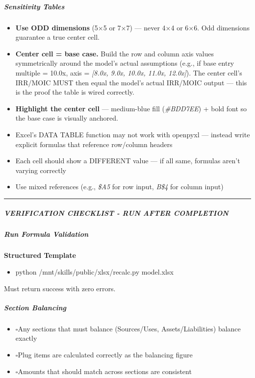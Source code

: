 \documentclass[11pt]{article}
\newcommand{\UncheckedBox}{$\square$}
\begin{document}
\subparagraph{Sensitivity Tables}\mbox{}\par
\begin{itemize}[leftmargin=*,itemsep=2pt,topsep=2pt]
\item {} \textbf{Use ODD dimensions} (5×5 or 7×7) — never 4×4 or 6×6. Odd dimensions guarantee a true center cell.
\item {} \textbf{Center cell = base case.} Build the row and column axis values symmetrically around the model's actual assumptions (e.g., if base entry multiple = 10.0x, axis = \emph{[8.0x, 9.0x, 10.0x, 11.0x, 12.0x]}). The center cell's IRR/MOIC MUST then equal the model's actual IRR/MOIC output — this is the proof the table is wired correctly.
\item {} \textbf{Highlight the center cell} — medium-blue fill (\emph{\#BDD7EE}) + bold font so the base case is visually anchored.
\item {} Excel's DATA TABLE function may not work with openpyxl — instead write explicit formulas that reference row/column headers
\item {} Each cell should show a DIFFERENT value — if all same, formulas aren't varying correctly
\item {} Use mixed references (e.g., \emph{\$A5} for row input, \emph{B\$4} for column input)
\end{itemize}

\vspace{0.5em}\hrule\vspace{0.5em}

\subparagraph{VERIFICATION CHECKLIST - RUN AFTER COMPLETION}\mbox{}\par

\subparagraph{Run Formula Validation}\mbox{}\par
\textbf{Structured Template}
\begin{itemize}[leftmargin=*,itemsep=2pt,topsep=2pt]
\item {} python /mnt/skills/public/xlsx/recalc.py model.xlsx
\end{itemize}
Must return success with zero errors.


\subparagraph{Section Balancing}\mbox{}\par
\begin{itemize}[leftmargin=*,itemsep=2pt,topsep=2pt]
\item {} \UncheckedBox Any sections that must balance (Sources/Uses, Assets/Liabilities) balance exactly
\item {} \UncheckedBox Plug items are calculated correctly as the balancing figure
\item {} \UncheckedBox Amounts that should match across sections are consistent
\end{itemize}
\end{document}
